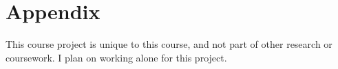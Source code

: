 \documentclass[10pt,twocolumn,letterpaper]{article}
\begin{document}






%
%

\section{Appendix}
This course project is unique to this course, and not part of other research or coursework. I plan on working alone for this project.
\end{document}
